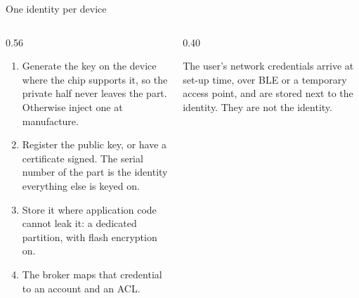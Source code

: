 \documentclass[10pt,aspectratio=169,t]{beamer}
\begin{document}
\begin{frame}[embedded,eyebrow=Trust]{One identity per device}
  \vskip 2mm
  \begin{columns}[T]
    \begin{column}{0.56\textwidth}
      \begin{enumerate}
        \item Generate the key on the device where the chip supports it, so the private half never leaves the part. Otherwise inject one at manufacture.
        \item Register the public key, or have a certificate signed. The serial number of the part is the identity everything else is keyed on.
        \item Store it where application code cannot leak it: a dedicated partition, with flash encryption on.
        \item The broker maps that credential to an account and an ACL.
      \end{enumerate}
    \end{column}
    \begin{column}{0.40\textwidth}
      \begin{hint}[Wi-Fi is separate]
        The user's network credentials arrive at set-up time, over BLE or a temporary access point, and are stored next to the identity. They are not the identity.
      \end{hint}
    \end{column}
  \end{columns}
\end{frame}
\end{document}
